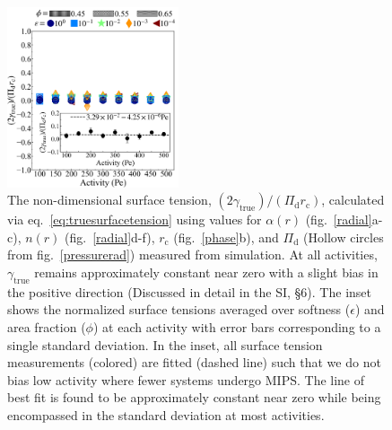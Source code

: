 \documentclass[twoside,twocolumn,9pt]{article}
\begin{document}
\begin{figure}[ht!]
\centering
    \includegraphics[width=0.45\textwidth]{figure_7.png}
  \caption{The non-dimensional surface tension, $(2\gamma_\mathrm{true})/(\Pi_\text{d}r_\text{c})$, calculated via eq.~\ref{eq:truesurfacetension} using values for $\alpha(r)$ (fig.~\ref{radial}a-c), $n(r)$ (fig.~\ref{radial}d-f), $r_\text{c}$ (fig.~\ref{phase}b), and $\Pi_\text{d}$ (Hollow circles from fig.~\ref{pressurerad}) measured from simulation.  At all activities, $\gamma_\mathrm{true}$ remains approximately constant near zero with a slight bias in the positive direction (Discussed in detail in the SI, \S 6).  The inset shows the normalized surface tensions averaged over softness ($\epsilon$) and area fraction ($\phi$) at each activity with error bars corresponding to a single standard deviation. In the inset, all surface tension measurements (colored) are fitted (dashed line) such that we do not bias low activity where fewer systems undergo MIPS.  The line of best fit is found to be approximately constant near zero while being encompassed in the standard deviation at most activities.}
  \label{surfacetense_norm}
\end{figure}
\end{document}
